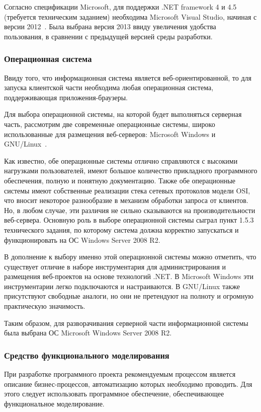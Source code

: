 Согласно спецификации Microsoft, для поддержки .NET framework 4 и 4.5 (требуется техническим заданием) необходима Microsoft Visual Studio, начиная с версии 2012~\cite{vs_mdn}.
Была выбрана версия 2013 ввиду увеличения удобства пользования, в сравнении с предыдущей версией среды разработки.

\subsubsection{Операционная система}

Ввиду того, что информационная система является веб-ориентированной, то для запуска клиентской части необходима любая операционная система, поддерживающая приложения-браузеры.

Для выбора операционной системы, на которой будет выполняться серверная часть, рассмотрим две современные операционные системы, широко использованные для размещения веб-серверов: Microsoft Windows и GNU/Linux~\cite{sunHosting}.

Как известно, обе операционные системы отлично справляются с высокими нагрузками пользователей, имеют большое количество прикладного программного обеспечения, полную и понятную документацию.
Также обе операционные системы имеют собственные реализации стека сетевых протоколов модели OSI, что вносит некоторое разнообразие в механизм обработки запроса от клиентов.
Но, в любом случае, эти различия не сильно сказываются на производительности веб-сервера.
Основную роль в выборе операционной системы сыграл пункт 1.5.3 технического задания, по которому система должна корректно запускаться и функционировать на ОС Windows Server 2008 R2.

В дополнение к выбору именно этой операционной системы можно отметить, что существует отличие в наборе инструментария для администрирования и размещения веб-проектов на основе технологий .NET.
В Microsoft Windows эти инструментарии легко подключаются и настраиваются.
В GNU/Linux также присутствуют свободные аналоги, но они не претендуют на полноту и огромную практическую значимость.

Таким образом, для разворачивания серверной части информационной системы была выбрана ОС Microsoft Windows Server 2008 R2.

\subsubsection{Средство функционального моделирования}

При разработке программного проекта рекомендуемым процессом является описание бизнес-процессов, автоматизацию которых необходимо проводить.
Для этого следует использовать программное обеспечение, обеспечивающее функциональное моделирование.

